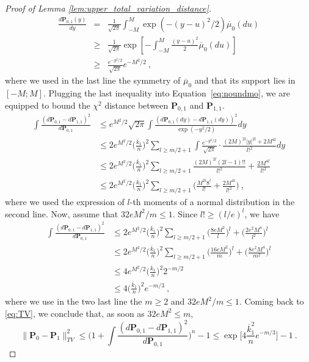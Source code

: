 \documentclass[twoside,11pt]{article}
\def\beqn{\begin{eqnarray*}}
\def\eeqn{\end{eqnarray*}}
\newcommand{\<}{\langle}
\renewcommand{\>}{\rangle}
\begin{document}
\begin{proof}[Proof of Lemma \ref{lem:upper_total_variation_distance}]
\beqn 
\frac{d{\mathbf P}_{0,1} (y)}{dy}&  =& \frac{1}{\sqrt{2\pi}}  \int_{-M}^{M} \exp(-(y-u)^2/2) \overline{\mu}_0(du) \\
& \geq  &\frac{1}{\sqrt{2\pi}}   \exp\left[ - \int_{-M}^{M} \frac{(y-u)^2}{2} \overline{\mu}_0(du) \right]\\
&\geq & \frac{e^{-y^2/2}}{\sqrt{2\pi}}e^{-M^2/2}\ ,
\eeqn 
where we used in the last line the symmetry of $\overline{\mu}_0$ and that its support lies in  $[-M;M]$.
Plugging the last inequality into Equation~\eqref{eq:noundmo}, we are equipped to bound the $\chi^2$ distance between ${\mathbf P}_{0,1}$ and ${\mathbf P}_{1,1}$. 
\begin{align*}
 \int \frac{(d{\mathbf P}_{0,1}  - d{\mathbf P}_{1,1})^2}{d{\mathbf P}_{0,1}}&\leq e^{M^2/2}\sqrt{2\pi} \int \frac{(d{\mathbf P}_{0,1}(dy)  - d{\mathbf P}_{1,1}(dy))^2}{\exp(-y^2/2)} dy\\
&\leq 2e^{M^2/2} \Big(\frac{ \overline{k}_1}{ n}\Big)^2  \sum_{l\geq m/2+1}  \int \frac{e^{-y^2/2}}{\sqrt{2\pi}}\cdot \frac{(2M)^{2l}|y|^{2l}+ 2M^{4l}}{ l!^2}dy\\
&\leq 2e^{M^2/2}\Big(\frac{ \overline{k}_1}{ n}\Big)^2  \sum_{l\geq m/2+1}  \frac{(2M)^{2l}(2l-1)!!}{l!^2}+ \frac{2M^{4l}}{l!^2}\\
&\leq 2e^{M^2/2}\Big(\frac{ \overline{k}_1}{ n}\Big)^2  \sum_{l\geq m/2 +1}  \Big(\frac{M^{2l}8^l}{l!}+ \frac{2M^{4l}}{l!^2}\Big)\ ,
\end{align*}
where we used the expression of $l$-th moments of a normal distribution in the second line.
Now, assume that $32eM^2/m\leq 1$. Since $l!\geq (l/e)^l$, we have
\begin{align*}
 \int \frac{(d{\mathbf P}_{0,1}  - d{\mathbf P}_{1,1})^2}{d{\mathbf P}_{0,1}}
&\leq 2e^{M^2/2}\Big(\frac{ \overline{k}_1}{ n}\Big)^2  \sum_{l\geq m/2 +1}  \Big(\frac{8eM^{2}}{l}\Big)^l+ \Big(\frac{2e^2M^{4}}{l^2}\Big)^l\\
&\leq 2e^{M^2/2}\Big(\frac{ \overline{k}_1}{ n}\Big)^2  \sum_{l\geq m/2 +1}  \Big(\frac{16eM^{2}}{m}\Big)^l+ \Big(\frac{8e^2M^{4}}{m^2}\Big)^l\\
&\leq 4 e^{M^2/2} \Big(\frac{ \overline{k}_1}{ n}\Big)^2  2^{-m/2}\\
& \leq 4 \Big(\frac{ \overline{k}_1}{ n}\Big)^2 e^{-m/3}\ ,
\end{align*}
where we use in the two last line the $m\geq 2$ and $32eM^2/m\leq 1$.
Coming back to \eqref{eq:TV}, we conclude that, as soon as $32eM^2\leq m$,
\[
\|{\mathbf P}_0 - {\mathbf P}_1\|_{TV}^2 \leq \big(1 + \int \frac{(d{\mathbf P}_{0,1}  - d{\mathbf P}_{1,1})^2}{d{\mathbf P}_{0,1}}\big)^{ n}-1\leq  \exp\Big[ 4\frac{ \overline{k}_1^2}{ n} e^{-m/3}\Big] - 1\ .\]


\end{proof}
\end{document}
